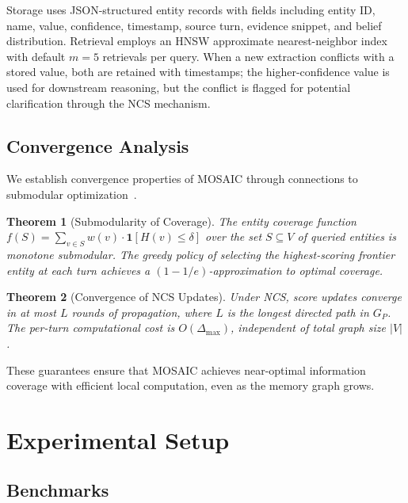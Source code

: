 \documentclass[10pt,twocolumn]{article}
\newtheorem{theorem}{Theorem}
\begin{document}
Storage uses JSON-structured entity records with fields including entity ID,
name, value, confidence, timestamp, source turn, evidence snippet, and belief
distribution. Retrieval employs an HNSW approximate nearest-neighbor index
with default $m = 5$ retrievals per query. When a new extraction conflicts
with a stored value, both are retained with timestamps; the higher-confidence
value is used for downstream reasoning, but the conflict is flagged for
potential clarification through the NCS mechanism.

\subsection{Convergence Analysis}
\label{sec:convergence}

We establish convergence properties of MOSAIC through connections to
submodular optimization~\citep{nemhauser1978analysis}.

\begin{theorem}[Submodularity of Coverage]
\label{thm:submodularity}
The entity coverage function
$f(S) = \sum_{v \in S} w(v) \cdot \mathbf{1}[H(v) \leq \delta]$ over the
set $S \subseteq V$ of queried entities is monotone submodular. The greedy
policy of selecting the highest-scoring frontier entity at each turn achieves
a $(1 - 1/e)$-approximation to optimal coverage.
\end{theorem}

\begin{theorem}[Convergence of NCS Updates]
\label{thm:convergence}
Under NCS, score updates converge in at most $L$ rounds of propagation, where
$L$ is the longest directed path in $G_P$. The per-turn computational cost is
$O(\Delta_{\max})$, independent of total graph size $|V|$.
\end{theorem}

These guarantees ensure that MOSAIC achieves near-optimal information coverage
with efficient local computation, even as the memory graph grows.

\section{Experimental Setup}
\label{sec:experiments}

\subsection{Benchmarks}
\label{sec:benchmarks}
\end{document}
